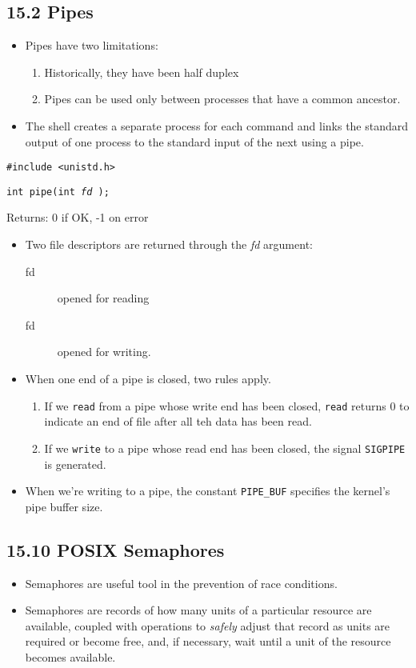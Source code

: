 \documentclass[]{article}
\newcommand{\code}{\texttt}
\begin{document}
\subsection*{15.2 Pipes}
\begin{itemize}
\item Pipes have two limitations:
\begin{enumerate}
\item Historically, they have been half duplex
\item Pipes can be used only between processes that have a common ancestor.
\end{enumerate}
\item The shell creates a separate process for each command and links the
standard output of one process to the standard input of the next using a pipe.
\end{itemize}

\code{\#include <unistd.h>}

\code{int pipe(int \emph{fd \rbrack});}

Returns: 0 if OK, -1 on error

\begin{itemize}
\item Two file descriptors are returned through the \emph{fd} argument:
\begin{description}
\item[fd \rbrack] opened for reading
\item[fd \rbrack] opened for writing.
\end{description}
\item  When one end of a pipe is closed, two rules apply.
\begin{enumerate}
\item If we \code{read} from a pipe whose write end has been closed, \code{read}
returns 0 to indicate an end of file after all teh data has been read.
\item If we \code{write} to a pipe whose read end has been closed, the signal
\code{SIGPIPE} is generated.
\end{enumerate}
\item When we're writing to a pipe, the constant \code{PIPE\_BUF} specifies the
kernel's pipe buffer size.
\end{itemize}

\subsection*{15.10 POSIX Semaphores}
\begin{itemize}
\item Semaphores are useful tool in the prevention of race conditions.
\item Semaphores are records of how many units of a particular resource are
available, coupled with operations to \emph{safely} adjust that record as units
are required or become free, and, if necessary, wait until a unit of the
resource becomes available.
\end{itemize}
\end{document}
